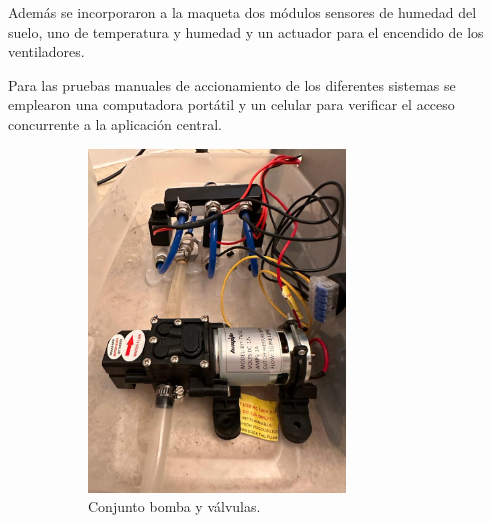 Además se incorporaron a la maqueta dos módulos sensores de humedad del suelo, uno de temperatura y humedad y un actuador para el encendido de los ventiladores.

Para las pruebas manuales de accionamiento de los diferentes sistemas se emplearon una computadora portátil y un celular para verificar el acceso concurrente a la aplicación central.

\begin{figure}[htpb]
     \centering
       \begin{subfigure}[b]{0.45\textwidth}
	    \centering
		 \includegraphics[width=0.75\textwidth]{./Figures/chapter4/pump_2.jpg}
		\caption{Conjunto bomba y válvulas.}
		\label{fig:pump}
     \end{subfigure}
          \hfill
     \begin{subfigure}[b]{0.45\textwidth}
		\centering

\end{subfigure}
\end{figure}
